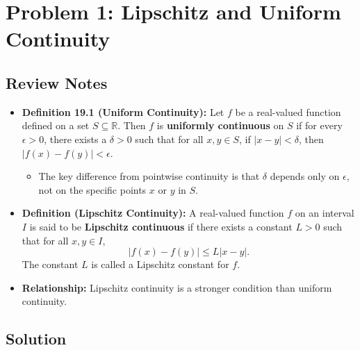 \documentclass{article}
\newcommand{\R}{\mathbb{R}}
\begin{document}
\section*{Problem 1: Lipschitz and Uniform Continuity}

\subsection*{Review Notes}

\begin{itemize}
    \item \textbf{Definition 19.1 (Uniform Continuity):} Let \(f\) be a real-valued function defined on a set \(S \subseteq \R\). Then \(f\) is \textbf{uniformly continuous} on \(S\) if for every \(\epsilon > 0\), there exists a \(\delta > 0\) such that for all \(x, y \in S\), if \(|x-y| < \delta\), then \(|f(x) - f(y)| < \epsilon\).
        \begin{itemize}
            \item The key difference from pointwise continuity is that \(\delta\) depends only on \(\epsilon\), not on the specific points \(x\) or \(y\) in \(S\).
        \end{itemize}

    \item \textbf{Definition (Lipschitz Continuity):} A real-valued function \(f\) on an interval \(I\) is said to be \textbf{Lipschitz continuous} if there exists a constant \(L > 0\) such that for all \(x, y \in I\),
        \[ |f(x) - f(y)| \le L |x-y|. \]
        The constant \(L\) is called a Lipschitz constant for \(f\).

    \item \textbf{Relationship:} Lipschitz continuity is a stronger condition than uniform continuity.
\end{itemize}

\subsection*{Solution}
\end{document}
